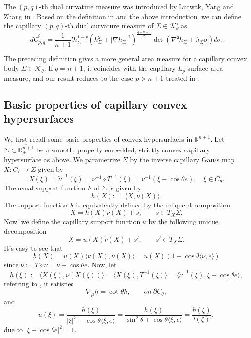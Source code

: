 \documentclass[11pt]{amsart}
\numberwithin{equation} {section}
\numberwithin{equation}{section}
\begin{document}
The $(p,q)$-th dual curvature measure was introduced by Lutwak, Yang and Zhang in \cite{LYZ18}. Based on the definition in \cite{LYZ18} and the above introduction, we can define the capillary $(p,q)$-th dual curvature measure of $\Sigma\in \mathcal{K}_{\theta}^{\circ}$ as 
$$ d\widetilde{C}_{p,q}^c =\frac{1}{n+1}lh_{\Sigma}^{1-p}\left(h_{\Sigma}^2 + |\nabla h_{\Sigma}|^2\right)^{\frac{q-n-1}{2}}\det(\nabla^2 h_{\Sigma}+h_{\Sigma}\sigma)d\sigma.$$




The preceding definition gives a more general area measure for a capillary convex body $\Sigma\in \mathcal{K}^{\circ}_{\theta}$. If $q=n+1$, it coincides with the capillary $L_p$-surface area measure, and our result reduces to the case $p>n+1$ treated in \cite{MWW25b}.

\subsection{Basic properties of capillary convex hypersurfaces}
We first recall some basic properties of convex hypersurfaces in $\mathbb{R}^{n+1}$. Let $\Sigma\subset\overline{\mathbb{R}^{n+1}_{+}}$ be a smooth, properly embedded, strictly convex capillary hypersurface as above. We parametrize $\Sigma$ by the inverse capillary Gauss map $X: C_{\theta}\to \Sigma$ given by
$$X(\xi) = \tilde{\nu}^{-1}(\xi) = \nu^{-1}\circ T^{-1}(\xi) = \nu^{-1}(\xi-\cos\theta e), \quad \xi\in C_{\theta}.$$
The usual support function $h$ of $\Sigma$ is given by
$$h(X) : =\langle X, \nu(X)\rangle.$$
The support function $h$ is equivalently defined by the unique decomposition
$$X = h(X)\nu (X) + s, \qquad s\in T_{X}\Sigma.$$
Now, we define the capillary support function $u$ by the following unique decomposition
\begin{equation}\label{e1}
     X = u(X)\tilde{\nu}(X) + s', \qquad s'\in T_{X}\Sigma.
\end{equation}
It's easy to see that
$$h(X) = u(X)\langle\nu(X), \tilde{\nu}(X)\rangle = u(X)(1+\cos\theta\langle\nu,e\rangle)$$
since $\tilde{\nu} := T\circ \nu = \nu + \cos\theta e$.
Now, let 
$$h(\xi):= \langle X(\xi),\nu(X(\xi))\rangle = \langle X(\xi), T^{-1}(\xi)\rangle = \langle\tilde{\nu}^{-1}(\xi), \xi-\cos\theta e\rangle,$$
referring to \cite[Proposition 2.4]{MWW25a}, it satisfies 
$$\nabla_{\mu}h = \cot\theta h, \qquad on~ \partial C_{\theta},$$
and 
$$u(\xi) = \frac{h(\xi)}{|\xi|^2 - \cos\theta\langle \xi,e\rangle} = \frac{h(\xi)}{\sin^2\theta + \cos\theta\langle \xi,e\rangle} = \frac{h(\xi)}{l(\xi)},$$
due to $|\xi - \cos\theta e|^2 =1$.
\end{document}

